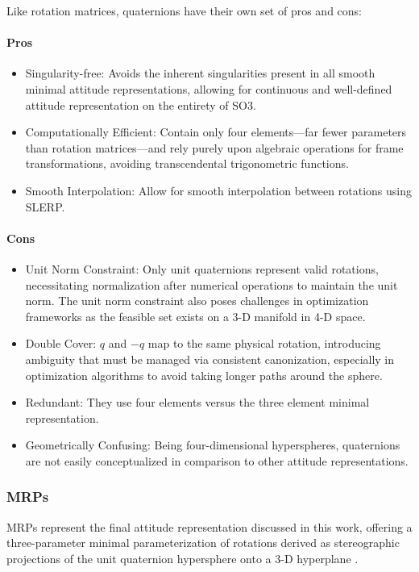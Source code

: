 Like rotation matrices, quaternions have their own set of pros and cons:
\paragraph{Pros}
\begin{itemize}
    \item Singularity-free: Avoids the inherent singularities present in all smooth minimal attitude representations, allowing for continuous and well-defined attitude representation on the entirety of \ac{SO3}.
    \item Computationally Efficient: Contain only four elements---far fewer parameters than rotation matrices---and rely purely upon algebraic operations for frame transformations, avoiding transcendental trigonometric functions.
    \item Smooth Interpolation: Allow for smooth interpolation between rotations using \ac{SLERP}.
\end{itemize}

\paragraph{Cons}
\begin{itemize}
    \item Unit Norm Constraint: Only unit quaternions represent valid rotations, necessitating normalization after numerical operations to maintain the unit norm. The unit norm constraint also poses challenges in optimization frameworks as the feasible set exists on a \ac{3-D} manifold in \ac{4-D} space.
    \item Double Cover: $q$ and $-q$ map to the same physical rotation, introducing ambiguity that must be managed via consistent canonization, especially in optimization algorithms to avoid taking longer paths around the sphere.
    \item Redundant: They use four elements versus the three element minimal representation. 
    \item Geometrically Confusing: Being four-dimensional hyperspheres, quaternions are not easily conceptualized in comparison to other attitude representations.
\end{itemize}

\subsubsection{\ac{MRP}s}
\label{par:mrps}

\ac{MRP}s represent the final attitude representation discussed in this work, offering a three-parameter minimal parameterization of rotations derived as stereographic projections of the unit quaternion hypersphere onto a \ac{3-D} hyperplane \cite{Schuster93}.

